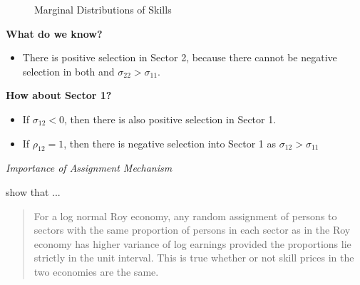 \begin{frame}
\begin{figure}[htp]\centering
\caption{Marginal Distributions of Skills}\label{Marginal Distributions of Skills}
\end{figure}
\end{frame}



\begin{frame}
\textbf{What do we know?}
\begin{itemize}\setlength\itemsep{1em}
\item There is positive selection in Sector 2, because there cannot be negative selection in both and $\sigma_{22} > \sigma_{11}$.
\end{itemize}\vspace{0.5cm}

\textbf{How about Sector 1?}
\begin{itemize}\setlength\itemsep{1em}
\item If $\sigma_{12} < 0$, then there is also positive selection in Sector 1.
\item If $\rho_{12} = 1$, then there is negative selection into Sector 1 as $\sigma_{12} > \sigma_{11}$
\end{itemize}

\end{frame}



\begin{frame}\begin{center}
\LARGE\textit{Importance of Assignment Mechanism}
\end{center}\end{frame}

\begin{frame}

\citet{Heckman.1990} show that ... \vspace{0.5cm}

\begin{quote} For a log normal Roy economy, any random assignment of persons to sectors with the same proportion of persons in each sector as in the Roy economy has higher variance of log earnings provided the proportions lie strictly in the unit interval. This is true whether or not skill prices in the two economies are the same.
\end{quote}
\end{frame}


